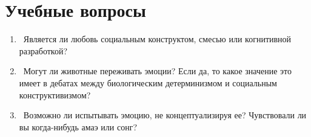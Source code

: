 \documentclass[11pt]{book}
\begin{document}
\section{Учебные вопросы}

\begin{tcolorbox}
  \begin{enumerate}
    \item\ Является ли любовь социальным конструктом, смесью или когнитивной разработкой?
    \item\ Могут ли животные переживать эмоции? Если да, то какое значение это имеет в дебатах между биологическим детерминизмом и социальным конструктивизмом?
    \item\ Возможно ли испытывать эмоцию, не концептуализируя ее? Чувствовали ли вы когда-нибудь амаэ или сонг?
  \end{enumerate}
\end{tcolorbox}
\end{document}
